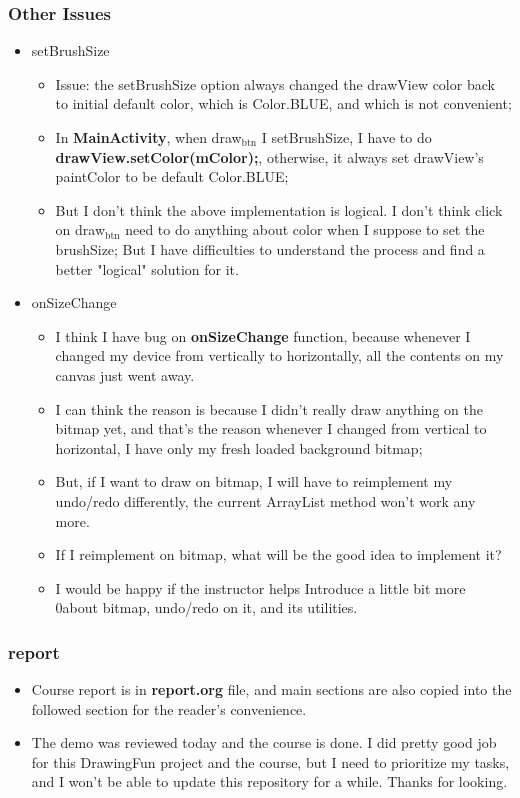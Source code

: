 \documentclass[9pt,b5paper]{article}
\begin{document}
\subsubsection{Other Issues}
\label{sec-6-2-4}
\begin{itemize}
\item setBrushSize 
\begin{itemize}
\item Issue: the setBrushSize option always changed the drawView color back to initial default color, which is Color.BLUE, and which is not convenient;
\item In \textbf{MainActivity}, when draw$_{\text{btn}}$ I setBrushSize, I have to do \textbf{drawView.setColor(mColor);}, otherwise, it always set drawView's paintColor to be default Color.BLUE;
\item But I don't think the above implementation is logical. I don't think click on draw$_{\text{btn}}$ need to do anything about color when I suppose to set the brushSize; But I have difficulties to understand the process and find a better "logical" solution for it.
\end{itemize}
\item onSizeChange
\begin{itemize}
\item I think I have bug on \textbf{onSizeChange} function, because whenever I changed my device from vertically to horizontally, all the contents on my canvas just went away.
\item I can think the reason is because I didn't really draw anything on the bitmap yet, and that's the reason whenever I changed from vertical to horizontal, I have only my fresh loaded background bitmap;
\item But, if I want to draw on bitmap, I will have to reimplement my undo/redo differently, the current ArrayList method won't work any more.
\item If I reimplement on bitmap, what will be the good idea to implement it?
\item I would be happy if the instructor helps Introduce a little bit more 0about bitmap, undo/redo on it, and its utilities.
\end{itemize}
\end{itemize}
\subsubsection{report}
\label{sec-6-2-5}
\begin{itemize}
\item Course report is in \textbf{report.org} file, and main sections are also copied into the followed section for the reader's convenience.
\item The demo was reviewed today and the course is done. I did pretty good job for this DrawingFun project and the course, but I need to prioritize my tasks, and I won't be able to update this repository for a while. Thanks for looking.
\end{itemize}
\end{document}

